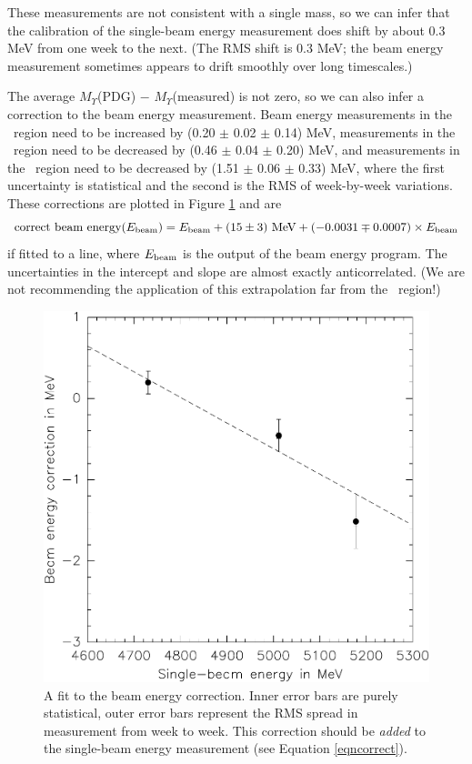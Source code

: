 \documentclass[aps,prd,preprint,superscriptaddress,tightenlines,nofootinbib,floatfix]{revtex4}
\begin{document}
These measurements are not consistent with a single mass, so we can
infer that the calibration of the single-beam energy measurement does
shift by about 0.3 MeV from one week to the next.  (The RMS shift is
0.3 MeV; the beam energy measurement sometimes appears to drift
smoothly over long timescales.)

The average $M_\Upsilon$(PDG) $-$ $M_\Upsilon$(measured) is not zero,
so we can also infer a correction to the beam energy measurement.
Beam energy measurements in the \uone\ region need to be increased by
(0.20 $\pm$ 0.02 $\pm$ 0.14) MeV, measurements in the \utwo\ region
need to be decreased by (0.46 $\pm$ 0.04 $\pm$ 0.20) MeV, and
measurements in the \uthree\ region need to be decreased by (1.51
$\pm$ 0.06 $\pm$ 0.33) MeV, where the first uncertainty is statistical
and the second is the RMS of week-by-week variations.  These
corrections are plotted in Figure \ref{correction} and are
\begin{equation}
  \mbox{correct beam energy}(E_{\mbox{\scriptsize beam}}) = E_{\mbox{\scriptsize beam}} + (15 \pm
  3) \mbox{ MeV} + (-0.0031 \mp 0.0007) \times E_{\mbox{\scriptsize beam}}
  \label{eqncorrect}
\end{equation}
if fitted to a line, where $E_{\mbox{\scriptsize beam}}$ is the output of the beam
energy program.  The uncertainties in the intercept and slope are
almost exactly anticorrelated.  (We are not recommending the
application of this extrapolation far from the \ups\ region!)

\begin{figure}[p]
  \begin{center}
    \includegraphics[width=\linewidth]{energycorrection}
  \end{center}
  \caption{\label{correction} A fit to the beam energy correction.
    Inner error bars are purely statistical, outer error bars
    represent the RMS spread in measurement from week to week.  This
    correction should be {\it added} to the single-beam energy
    measurement (see Equation \ref{eqncorrect}).}
\end{figure}
\end{document}
